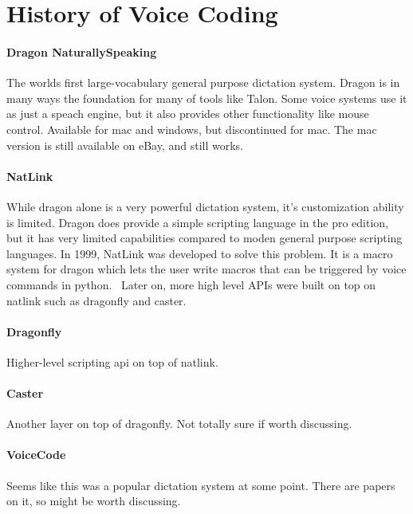 \documentclass[a4paper,english]{ifimaster}
\begin{document}
\section{History of Voice Coding}

\paragraph{Dragon NaturallySpeaking}
The worlds first large-vocabulary general purpose dictation system.
Dragon is in many ways the foundation for many of tools like Talon.
Some voice systems use it as just a speach engine, but it also provides other functionality like mouse control.
Available for mac and windows, but discontinued for mac.%
The mac version is still available on eBay, and still works. %

\paragraph{NatLink}
While dragon alone is a very powerful dictation system, it's customization ability is limited.
Dragon does provide a simple scripting language in the pro edition, but it has very limited capabilities compared to
moden general purpose scripting languages.
In 1999, NatLink was developed to solve this problem. It is a macro system for dragon which lets the user write macros that can be triggered by voice commands
in python.~\parencite{gould2001implementation}
Later on, more high level APIs were built on top on natlink such as dragonfly and caster. %

\paragraph{Dragonfly}
Higher-level scripting api on top of natlink.

\paragraph{Caster}
Another layer on top of dragonfly. Not totally sure if worth discussing.

\paragraph{VoiceCode}
Seems like this was a popular dictation system at some point. There are papers on it, so might be worth discussing.
\end{document}
